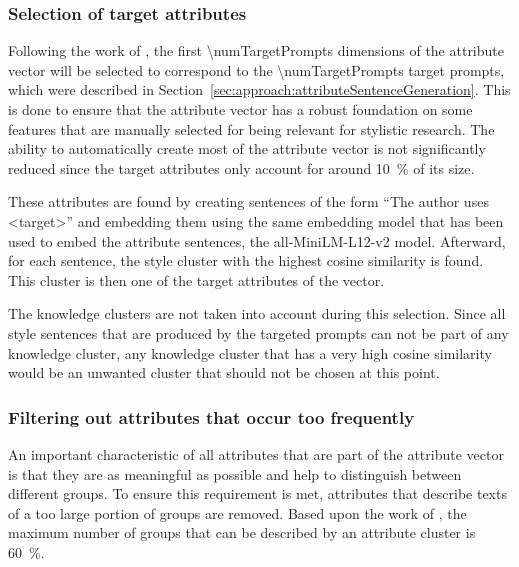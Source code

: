 \subsubsection{Selection of target attributes}
\label{sec:experiments:setup:selection:targetAttributes}
Following the work of \citet{patelLearningInterpretableStyle2023}, the first \num{\numTargetPrompts} dimensions of the attribute vector will be selected to correspond to the \num{\numTargetPrompts} target prompts, which were described in Section~\ref{sec:approach:attributeSentenceGeneration}.
This is done to ensure that the attribute vector has a robust foundation on some features that are manually selected for being relevant for stylistic research. The ability to automatically create most of the attribute vector is not significantly reduced since the target attributes only account for around \SI{10}{\percent} of its size.

These attributes are found by creating sentences of the form \enquote{The author uses <target>} and embedding them using the same embedding model that has been used to embed the attribute sentences, the all-MiniLM-L12-v2 model.
Afterward, for each sentence, the style cluster with the highest cosine similarity is found. This cluster is then one of the target attributes of the vector.

The knowledge clusters are not taken into account during this selection. Since all style sentences that are produced by the targeted prompts can not be part of any knowledge cluster, any knowledge cluster that has a very high cosine similarity would be an unwanted cluster that should not be chosen at this point.


\subsubsection{Filtering out attributes that occur too frequently}
\label{sec:experiments:setup:selection:filteringOccurance}
An important characteristic of all attributes that are part of the attribute vector is that they are as meaningful as possible and help to distinguish between different groups. To ensure this requirement is met, attributes that describe texts of a too large portion of groups are removed. Based upon the work of \citet{patelLearningInterpretableStyle2023}, the maximum number of groups that can be described by an attribute cluster is \SI{60}{\percent}.

